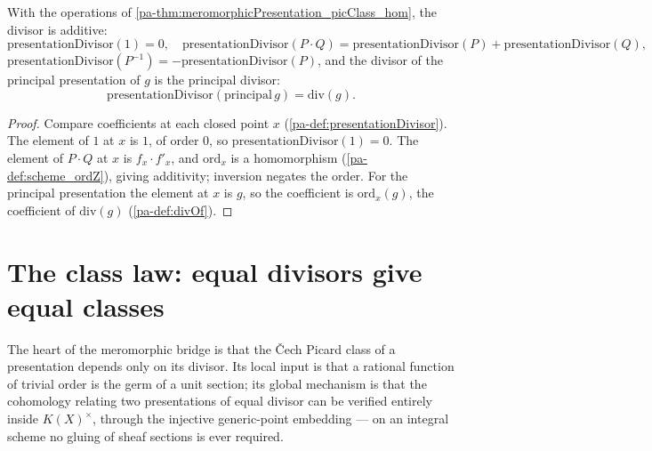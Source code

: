 \begin{theorem}
  \label{pa-thm:presentationDivisor_hom}
  \leanok

  With the operations of \ref{pa-thm:meromorphicPresentation_picClass_hom}, the divisor is additive:
  \[
    \mathrm{presentationDivisor}(1) = 0, \quad \mathrm{presentationDivisor}(P \cdot Q) =
      \mathrm{presentationDivisor}(P) + \mathrm{presentationDivisor}(Q),
  \]
  \(\mathrm{presentationDivisor}(P^{-1}) = -\mathrm{presentationDivisor}(P)\), and the divisor of
  the principal presentation of \(g\) is the principal divisor:
  \[
    \mathrm{presentationDivisor}(\mathrm{principal}\, g) = \mathrm{div}(g).
  \]
\end{theorem}
\begin{proof}
  \leanok
  Compare coefficients at each closed point \(x\) (\ref{pa-def:presentationDivisor}). The element of
  \(1\) at \(x\) is \(1\), of order \(0\), so \(\mathrm{presentationDivisor}(1) = 0\). The element
  of \(P \cdot Q\) at \(x\) is \(f_x \cdot f'_x\), and \(\mathrm{ord}_x\) is a homomorphism
  (\ref{pa-def:scheme_ordZ}), giving additivity; inversion negates the order. For the principal
  presentation the element at \(x\) is \(g\), so the coefficient is \(\mathrm{ord}_x(g)\), the
  coefficient of \(\mathrm{div}(g)\) (\ref{pa-def:divOf}).
\end{proof}

\section{The class law: equal divisors give equal classes}

The heart of the meromorphic bridge is that the \v Cech Picard class of a presentation depends
only on its divisor. Its local input is that a rational function of trivial order is the germ of a
unit section; its global mechanism is that the cohomology relating two presentations of equal
divisor can be verified entirely inside \(K(X)^{\times}\), through the injective generic-point
embedding --- on an integral scheme no gluing of sheaf sections is ever required.

